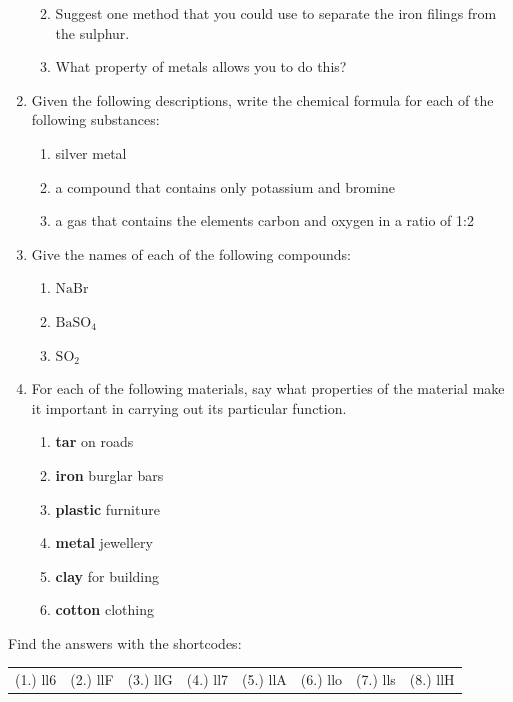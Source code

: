 \begin{enumerate}[noitemsep, label=\textbf{\arabic*}. ]
\begin{enumerate}[noitemsep, label=\textbf{\alph*}. ]
            \label{m38706*uid147}\item Suggest one method that you could use to separate the iron filings from the sulphur.
\label{m38706*uid148}\item What property of metals allows you to do this?
\end{enumerate}
\label{m38706*uid149}\item Given the following descriptions, write the chemical formula for each of the following substances:
\label{m38706*id68304}\begin{enumerate}[noitemsep, label=\textbf{\alph*}. ] 
            \label{m38706*uid150}\item silver metal
\label{m38706*uid151}\item a compound that contains only potassium and bromine
\label{m38706*uid152}\item a gas that contains the elements carbon and oxygen in a ratio of 1:2
\end{enumerate}
\label{m38706*uid153}\item Give the names of each of the following compounds:
\label{m38706*id68358}\begin{enumerate}[noitemsep, label=\textbf{\alph*}. ] 
            \label{m38706*uid154}\item $\mathrm{NaBr}$
\label{m38706*uid155}\item ${\mathrm{BaSO}}_{4}$\label{m38706*uid156}\item ${\mathrm{SO}}_{2}$ \end{enumerate}
\label{m38706*uid157}\item For each of the following materials, say what properties of the material make it important in carrying out its particular function.
\label{m38706*id68436}\begin{enumerate}[noitemsep, label=\textbf{\alph*}. ] 
            \label{m38706*uid158}\item \textbf{tar} on roads
\label{m38706*uid159}\item \textbf{iron} burglar bars
\label{m38706*uid160}\item \textbf{plastic} furniture
\label{m38706*uid161}\item \textbf{metal} jewellery
\label{m38706*uid162}\item \textbf{clay} for building
\label{m38706*uid163}\item \textbf{cotton} clothing
\end{enumerate}
\end{enumerate}
  \label{m38706**end}
  \label{09a7a4809656be0b739ee130746cd803**end}
\par {} Find the answers with the shortcodes:
 \par \begin{tabular}[h]{cccccc}
 (1.) ll6  &  (2.) llF  &  (3.) llG  &  (4.) ll7  &  (5.) llA  &  (6.) llo  &  (7.) lls  &  (8.) llH  & \end{tabular}
